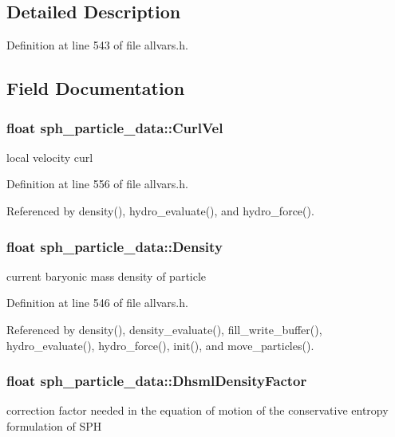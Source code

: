 \subsection{Detailed Description}


Definition at line 543 of file allvars.h.



\subsection{Field Documentation}
\hypertarget{structsph__particle__data_a843c827a50c8783218cd850925deb575}{
\subsubsection[{CurlVel}]{\setlength{\rightskip}{0pt plus 5cm}float {\bf sph\_\-particle\_\-data::CurlVel}}}
\label{structsph__particle__data_a843c827a50c8783218cd850925deb575}
local velocity curl 

Definition at line 556 of file allvars.h.



Referenced by density(), hydro\_\-evaluate(), and hydro\_\-force().

\hypertarget{structsph__particle__data_aaeca7f3efec44ebd5b7d36ce79d38779}{
\subsubsection[{Density}]{\setlength{\rightskip}{0pt plus 5cm}float {\bf sph\_\-particle\_\-data::Density}}}
\label{structsph__particle__data_aaeca7f3efec44ebd5b7d36ce79d38779}
current baryonic mass density of particle 

Definition at line 546 of file allvars.h.



Referenced by density(), density\_\-evaluate(), fill\_\-write\_\-buffer(), hydro\_\-evaluate(), hydro\_\-force(), init(), and move\_\-particles().

\hypertarget{structsph__particle__data_af49cca403dc402fdb0d0d481d49d7b53}{
\subsubsection[{DhsmlDensityFactor}]{\setlength{\rightskip}{0pt plus 5cm}float {\bf sph\_\-particle\_\-data::DhsmlDensityFactor}}}
\label{structsph__particle__data_af49cca403dc402fdb0d0d481d49d7b53}
correction factor needed in the equation of motion of the conservative entropy formulation of SPH 

